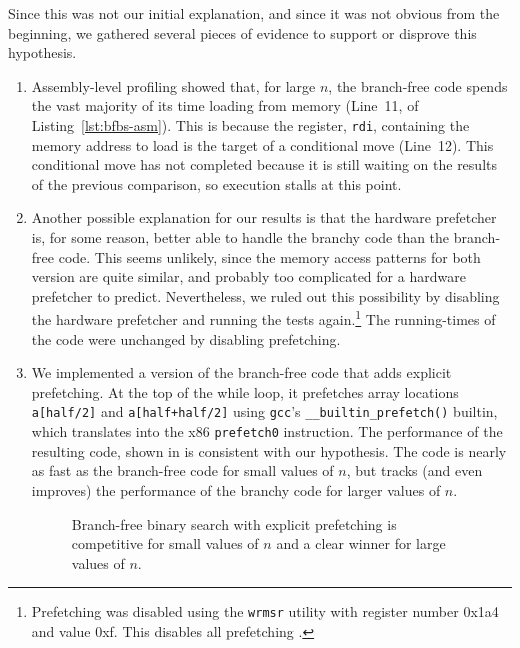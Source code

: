 \documentclass{patmorin}
\newcommand{\lstref}[1]{Listing~\ref{lst:#1}}
\begin{document}
Since this was not our initial explanation, and since it was not obvious
from the beginning, we gathered several pieces of evidence to support
or disprove this hypothesis.

\begin{enumerate}
\item Assembly-level profiling showed that, for large $n$, the
  branch-free code spends the vast majority of its time loading from
  memory (Line~11, of \lstref{bfbs-asm}).  This is because the register,
  \texttt{rdi},  containing the memory address to load is the
  target of a conditional move (Line~12).  This conditional move has not
  completed because it is still waiting on the results of the previous
  comparison, so execution stalls at this point.

\item Another possible explanation for our results is that the hardware
   prefetcher is, for some reason, better able to handle the branchy
   code than the branch-free code.  This seems unlikely, since the memory
   access patterns for both version are quite similar, and probably too
   complicated for a hardware prefetcher to predict. Nevertheless, we
   ruled out this possibility by disabling the hardware prefetcher and
   running the tests again.\footnote{Prefetching was disabled using the
   \texttt{wrmsr} utility with register number 0x1a4 and
   value 0xf.  This disables all prefetching \cite{intel:optimizing}.}
   The running-times of the code were unchanged by disabling prefetching.

\item We implemented a version of the branch-free code that adds explicit
   prefetching. At the top of the while loop, it
   prefetches array locations \texttt{a[half/2]}
   and \texttt{a[half+half/2]} using \texttt{gcc}'s
   \texttt{__builtin_prefetch()} builtin, which translates into
   the x86 \texttt{prefetch0} instruction.  The performance of
   the resulting code, shown in  is consistent with our
   hypothesis.  The code is nearly as fast as the branch-free code for
   small values of $n$, but tracks (and even improves) the performance
   of the branchy code for larger values of $n$.

\begin{figure}
   \caption{Branch-free binary search with explicit prefetching is competitive
    for small values of $n$ and a clear winner for large values of $n$.}
\end{figure}


\end{enumerate}
\end{document}
